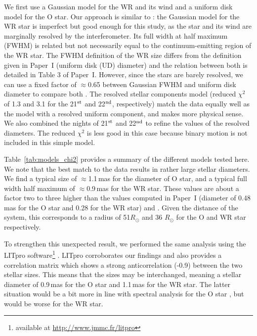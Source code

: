 \documentclass[usenatbib]{mnras}%
\begin{document}
We first use a Gaussian model for the WR and its wind and a uniform disk model for the O star. Our approach is similar to  \citet{2007MNRAS.377..415N}: the Gaussian model for the WR star is imperfect but good enough for this study, as the star and its wind are marginally resolved by the interferometer. Its full width at half maximum (FWHM) is related but not necessarily equal to the continuum-emitting region of the WR star. The FWHM definition of the WR size differs from the definition given in Paper~I (uniform disk (UD) diameter) and the relation between both is detailed in  Table 3 of Paper~I. However, since the stars are barely resolved, we can use a fixed factor of $\approx$0.65 between Gaussian FWHM and uniform disk diameter to compare both \citep[see e.g. values in Table 1 of][]{1995MNRAS.276..640H}. The resolved stellar components model (reduced $\chi^2$ of 1.3 and 3.1 for the 21$^{\rm st}$ and 22$^{\rm nd}$, respectively) match the data equally well as the model with a resolved uniform component, and makes more physical sense. We also combined the nights of 21$^{\rm st}$ and 22$^{\rm nd}$ to refine the values of the resolved diameters.  The reduced $\chi^2$ is less good in this case because binary motion is not included in this simple model.


Table~\ref{tab:models_chi2} provides a summary of the different models tested here. We note that the best match to the data results in rather large stellar diameters. We find a typical size of $\approx$1.1\,mas for the diameter of O star, and a typical full width half maximum of $\approx$0.9\,mas for the WR star. These values are about a factor two to three higher than the values computed in Paper~I (diameter of 0.48\,mas for the O star and 0.28 for the WR star) and \citet{2007MNRAS.377..415N}. Given the distance of the system, this corresponds to a radius of 51$R_{\odot}$ and 36 $R_{\odot}$ for the O and WR star respectively.

To strengthen this unexpected result, we performed the same analysis using the  LITpro software\footnote{available at \url{http://www.jmmc.fr/litpro}} \citep{2008SPIE.7013E..44T}. LITpro corroborates our findings and also provides a correlation matrix which shows a strong anticorrelation (-0.9) between the two stellar sizes. This means that the sizes may be interchanged, meaning a stellar diameter of 0.9\,mas for the O star and 1.1\,mas for the WR star. The latter situation would be a bit more in line with spectral analysis for the O star \citep{1999A&A...345..163D}, but would be worse for the WR star. 
\end{document}
